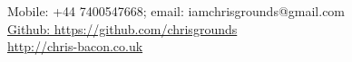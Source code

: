 \begin{center}
	Mobile: +44 7400547668; email: iamchrisgrounds@gmail.com\\
	\href{https://github.com/chris-bacon}{Github: https://github.com/chrisgrounds}\\
	\href{http://chris-bacon.co.uk}{http://chris-bacon.co.uk}
\end{center}